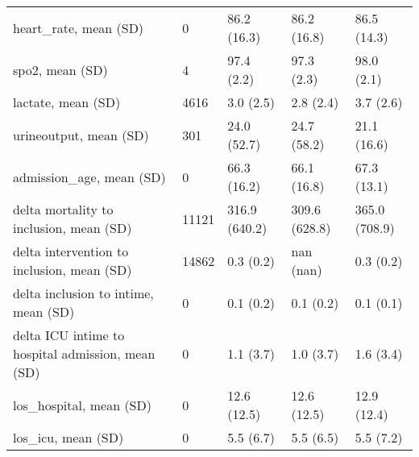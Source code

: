 \begin{tabular}{lllll}
heart\_rate, mean (SD)                             &       0 &    86.2 (16.3) &       86.2 (16.8) &            86.5 (14.3) \\
spo2, mean (SD)                                   &       4 &     97.4 (2.2) &        97.3 (2.3) &             98.0 (2.1) \\
lactate, mean (SD)                                &    4616 &      3.0 (2.5) &         2.8 (2.4) &              3.7 (2.6) \\
urineoutput, mean (SD)                            &     301 &    24.0 (52.7) &       24.7 (58.2) &            21.1 (16.6) \\
admission\_age, mean (SD)                          &       0 &    66.3 (16.2) &       66.1 (16.8) &            67.3 (13.1) \\
delta mortality to inclusion, mean (SD)           &   11121 &  316.9 (640.2) &     309.6 (628.8) &          365.0 (708.9) \\
delta intervention to inclusion, mean (SD)        &   14862 &      0.3 (0.2) &         nan (nan) &              0.3 (0.2) \\
delta inclusion to intime, mean (SD)              &       0 &      0.1 (0.2) &         0.1 (0.2) &              0.1 (0.1) \\
delta ICU intime to hospital admission, mean (SD) &       0 &      1.1 (3.7) &         1.0 (3.7) &              1.6 (3.4) \\
los\_hospital, mean (SD)                           &       0 &    12.6 (12.5) &       12.6 (12.5) &            12.9 (12.4) \\
los\_icu, mean (SD)                                &       0 &      5.5 (6.7) &         5.5 (6.5) &              5.5 (7.2) \\
\bottomrule
\end{tabular}
